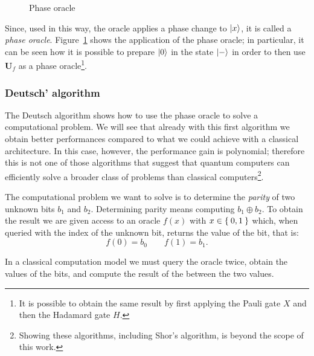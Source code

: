 \begin{figure}
	\centering
	\vspace{.2cm}
	\caption{Phase oracle}
	\label{fig:phase_oracle}
\end{figure}
Since, used in this way, the oracle applies a phase change to $\Ket{x}$, it is called a \emph{phase oracle}. Figure~\ref{fig:phase_oracle} shows the application of the phase oracle; in particular, it can be seen how it is possible to prepare $\Ket{0}$ in the state $\Ket{-}$ in order to then use $\mathbf{U}_f$ as a phase oracle\footnote{It is possible to obtain the same result by first applying the Pauli gate $X$ and then the Hadamard gate $H$.}.

\subsubsection*{Deutsch' algorithm}
The Deutsch algorithm shows how to use the phase oracle to solve a computational problem. We will see that already with this first algorithm we obtain better performances compared to what we could achieve with a classical architecture. In this case, however, the performance gain is polynomial; therefore this is not one of those algorithms that suggest that quantum computers can efficiently solve a broader class of problems than classical computers\footnote{Showing these algorithms, including Shor's algorithm, is beyond the scope of this work.}.

The computational problem we want to solve is to determine the \emph{parity} of two unknown bits $b_1$ and $b_2$. Determining parity means computing $b_1 \oplus b_2$. To obtain the result we are given access to an oracle $f(x)$ with $x \in \Set{0,1}$ which, when queried with the index of the unknown bit, returns the value of the bit, that is:
\[
f(0) = b_0 \qquad f(1) = b_1.
\]

In a classical computation model we must query the oracle twice, obtain the values of the bits, and compute the result of the  between the two values.

